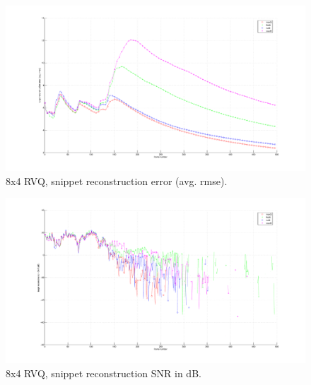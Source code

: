 								\begin{figure}[h!]
								\centering
								\includegraphics[height=0.4\textheight]{thesis/4_trellis70_8_4_1000_snp_armse.pdf}
								\caption{8x4 RVQ, snippet reconstruction error (avg. rmse).}
								\label{fig:4_trellis70_8_4_1000_snp_armse}
								\end{figure}

								\begin{figure}[h!]
								\centering
								\includegraphics[height=0.4\textheight]{thesis/4_trellis70_8_4_1000_snp_SNRdB.pdf}
								\caption{8x4 RVQ, snippet reconstruction SNR in dB.}
								\label{fig:4_trellis70_8_4_1000_snp_SNRdB}
								\end{figure}
\clearpage
\newpage
